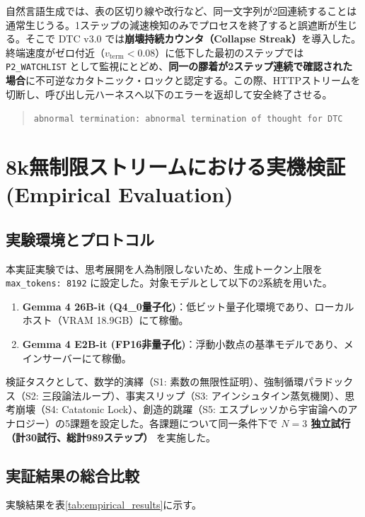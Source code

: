 \documentclass[11pt,a4paper]{article}
\begin{document}
自然言語生成では、表の区切り線や改行など、同一文字列が2回連続することは通常生じうる。1ステップの減速検知のみでプロセスを終了すると誤遮断が生じる。そこで DTC v3.0 では\textbf{崩壊持続カウンタ（Collapse Streak）}を導入した。終端速度がゼロ付近（$v_{\mathrm{term}} < 0.08$）に低下した最初のステップでは \texttt{P2\_WATCHLIST} として監視にとどめ、\textbf{同一の膠着が2ステップ連続で確認された場合}に不可逆なカタトニック・ロックと認定する。この際、HTTPストリームを切断し、呼び出し元ハーネスへ以下のエラーを返却して安全終了させる。
\begin{quote}
\texttt{abnormal termination: abnormal termination of thought for DTC}
\end{quote}

\section{8k無制限ストリームにおける実機検証 (Empirical Evaluation)}

\subsection{実験環境とプロトコル}

本実証実験では、思考展開を人為制限しないため、生成トークン上限を \texttt{max\_tokens: 8192} に設定した。対象モデルとして以下の2系統を用いた。
\begin{enumerate}
    \item \textbf{Gemma 4 26B-it (Q4\_0量子化)}：低ビット量子化環境であり、ローカルホスト（VRAM 18.9GB）にて稼働。
    \item \textbf{Gemma 4 E2B-it (FP16非量子化)}：浮動小数点の基準モデルであり、メインサーバーにて稼働。
\end{enumerate}
検証タスクとして、数学的演繹（S1: 素数の無限性証明）、強制循環パラドックス（S2: 三段論法ループ）、事実スリップ（S3: アインシュタイン蒸気機関）、思考崩壊（S4: Catatonic Lock）、創造的跳躍（S5: エスプレッソから宇宙論へのアナロジー）の5課題を設定した。各課題について同一条件下で \textbf{$N=3$ 独立試行（計30試行、総計989ステップ）} を実施した。

\subsection{実証結果の総合比較}

実験結果を表\ref{tab:empirical_results}に示す。
\end{document}
